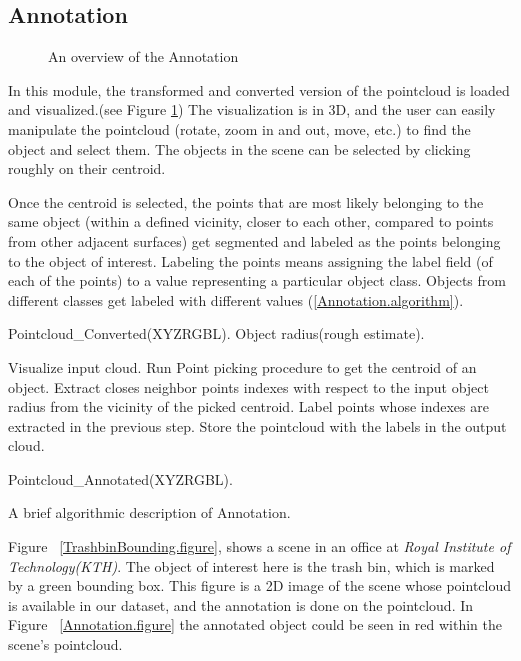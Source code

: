  
 
\subsection{Annotation}
\label{Annotation.ssec}

\begin{figure}[t]
  \caption[Annotation Overview Flowchart]
  {An overview of the Annotation}
  \label{AnnotationFlowchart.figure}
\end{figure}


In this module, the transformed and converted version of the pointcloud is loaded and visualized.(see Figure \ref{AnnotationFlowchart.figure}) The visualization is in 3D, and the user can easily manipulate the pointcloud (rotate, zoom in and out, move, etc.) to find the object and select them. 
The objects in the scene can be selected by clicking roughly on their centroid. 

Once the centroid is selected, the points that are most likely belonging to the same object (within a defined vicinity, closer to each other, compared to points from other adjacent surfaces) get segmented and labeled as the points belonging to the object of interest. Labeling the points means assigning the label field (of each of the points) to a value representing a particular object class. 
Objects from different classes get labeled with different values (\ref{Annotation.algorithm}).

\begin{algorithm}[t]
\begin{algorithmic}[1]
\REQUIRE Pointcloud\_Converted(XYZRGBL).
\REQUIRE Object radius(rough estimate).
\medskip

\STATE Visualize input cloud.
  \STATE Run Point picking procedure to get the centroid of an object.
  \STATE Extract closes neighbor points indexes with respect to the input object radius from the vicinity of the picked centroid.
  \STATE Label points whose indexes are extracted in the previous step.
\ENDFOR
\STATE Store the pointcloud with the labels in the output cloud.

\medskip
\ENSURE Pointcloud\_Annotated(XYZRGBL).
\end{algorithmic}
\caption[Annotation.]
{A brief algorithmic description of Annotation.}
\label{Annotation.algorithm}
\end{algorithm}


Figure ~\ref{TrashbinBounding.figure}, shows a scene in an office at {\it Royal Institute of Technology(KTH)}. The object of interest here is the trash bin, which is marked by a green bounding box. This figure is a 2D image of the scene whose pointcloud is available in our dataset, and the annotation is done on the pointcloud. In Figure ~\ref{Annotation.figure} the annotated object could be seen in red within the scene's pointcloud.


